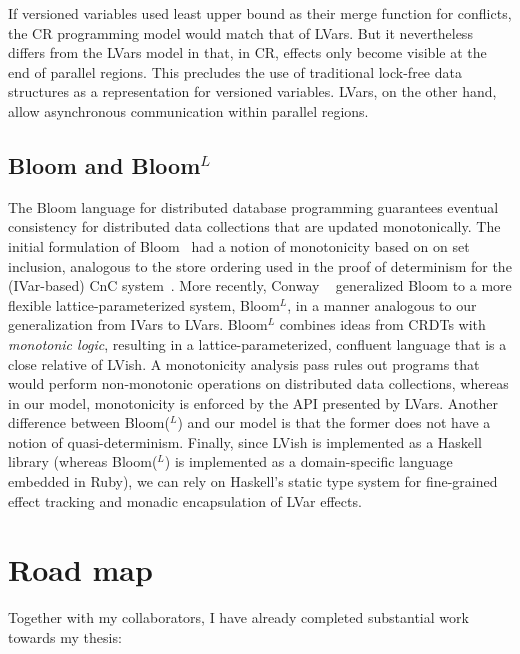 \documentclass{article}
\begin{document}
If versioned variables used least upper bound as their merge function
for conflicts, the CR programming model would match that of LVars.    But it nevertheless
differs from the LVars model in that, in CR, effects only become
visible at the end of parallel regions. 
This precludes the use of traditional lock-free data structures as a
representation for versioned variables.  LVars, on the other hand,
allow asynchronous communication within parallel regions.

\subsection{Bloom and Bloom$^L$}

The Bloom language for distributed database programming guarantees
eventual consistency for distributed data collections that are updated
monotonically.  The initial formulation of Bloom~\cite{bloom-cidr} had
a notion of monotonicity based on on set inclusion, analogous to the
store ordering used in the proof of determinism for the (IVar-based)
CnC system~\cite{CnC}.  More recently, Conway \etal~\cite{blooml}
generalized Bloom to a more flexible lattice-parameterized system,
Bloom$^L$, in a manner analogous to our generalization from IVars to
LVars.  Bloom$^L$ combines ideas from CRDTs with \emph{monotonic
  logic}, resulting in a lattice-parameterized, confluent language
that is a close relative of LVish.  A monotonicity analysis pass rules
out programs that would perform non-monotonic operations on
distributed data collections, whereas in our model, monotonicity is
enforced by the API presented by LVars.  Another difference between
Bloom($^L$) and our model is that the former does not have a notion of
quasi-determinism.  Finally, since LVish is implemented as a
Haskell library (whereas Bloom($^L$) is implemented as a
domain-specific language embedded in Ruby), we can rely on Haskell's
static type system for fine-grained effect tracking and monadic
encapsulation of LVar effects.

\section{Road map}

Together with my collaborators, I have already completed substantial
work towards my thesis:
\end{document}
